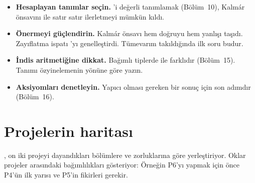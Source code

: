 \begin{itemize}
  \item \textbf{Hesaplayan tanımlar seçin.} 'i  değerli
        tanımlamak (Bölüm~10), Kalmár önsavını  ile satır satır
        ilerletmeyi mümkün kıldı.
  \item \textbf{Önermeyi güçlendirin.} Kalmár önsavı hem doğruyu hem yanlışı
        taşıdı. Zayıflatma ispatı 'yı genelleştirdi. Tümevarım
        takıldığında ilk soru budur.
  \item \textbf{İndis aritmetiğine dikkat.} Bağımlı tiplerde  ile
         farklıdır (Bölüm~15). Tanımı özyinelemenin yönüne göre
        yazın.
  \item \textbf{Aksiyomları denetleyin.} Yapıcı olması gereken bir sonuç
        için   son adımdır (Bölüm~16).
\end{itemize}

\section{Projelerin haritası}\label{sec:proje-haritasi}

, on iki projeyi dayandıkları bölümlere ve
zorluklarına göre yerleştiriyor. Oklar projeler arasındaki
bağımlılıkları gösteriyor: Örneğin P6'yı yapmak için önce P4'ün ilk
yarısı ve P5'in fikirleri gerekir.

